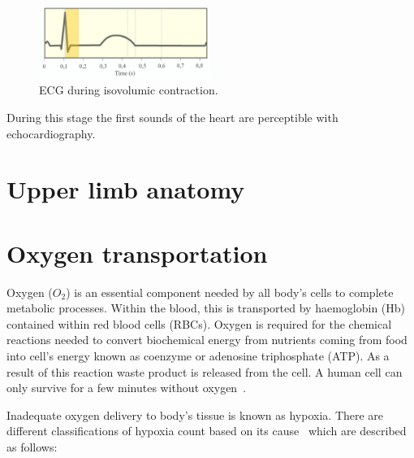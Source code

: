 \begin{figure}[!htpb]
	\centering
	\includegraphics[width=0.5\textwidth,keepaspectratio]{figure_5}    
	\caption[Isovolumic contraction - ECG]{ECG during isovolumic contraction.}
	\label{fig:ECG isovolumic}
\end{figure}

During this stage the first sounds of the heart are perceptible with echocardiography. 
 
\section{Upper limb anatomy}

\section{Oxygen transportation}
\label{section literature 1.2}
Oxygen ($O_2$) is an essential component needed by all body's cells to complete metabolic processes. Within the blood, this is transported by haemoglobin (Hb) contained within red blood cells (RBCs). Oxygen is required for the chemical reactions needed to convert biochemical energy from nutrients coming from food into cell's energy known as coenzyme or adenosine triphosphate (ATP). As a result of this reaction waste product is released from the cell. A human cell can only survive for a few minutes without oxygen~\cite{culmsee2005apoptosis}.

Inadequate oxygen delivery to body's tissue is known as hypoxia. There are different classifications of hypoxia count based on its cause~\cite{marieb2007human} which are described as follows: 

